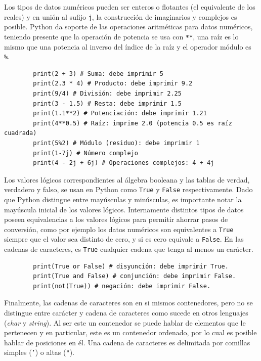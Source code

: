 Los tipos de datos numéricos pueden ser enteros o flotantes (el
equivalente de los reales) y en unión al sufijo \texttt{j}, la
construcción de imaginarios y complejos es posible. Python da soporte de
las operaciones aritméticas para datos numéricos, teniendo presente que
la operación de potencia se usa con \texttt{**}, una raíz es lo mismo
que una potencia al inverso del índice de la raíz y el operador módulo
es \texttt{\%}.

\begin{listing}[H]
    \begin{verbatim}
        print(2 + 3) # Suma: debe imprimir 5
        print(2.3 * 4) # Producto: debe imprimir 9.2
        print(9/4) # División: debe imprimir 2.25
        print(3 - 1.5) # Resta: debe imprimir 1.5
        print(1.1**2) # Potenciación: debe imprimir 1.21
        print(4**0.5) # Raíz: imprime 2.0 (potencia 0.5 es raíz cuadrada)
        print(5%2) # Módulo (residuo): debe imprimir 1
        print(1-7j) # Número complejo
        print(4 - 2j + 6j) # Operaciones complejos: 4 + 4j
    \end{verbatim}
\end{listing}


Los valores lógicos correspondientes al álgebra booleana y las tablas de
verdad, verdadero y falso, se usan en Python como \texttt{True} y
\texttt{False} respectivamente. Dado que Python distingue entre
mayúsculas y minúsculas, es importante notar la mayúscula inicial de los
valores lógicos. Internamente distintos tipos de datos poseen
equivalencias a los valores lógicos para permitir ahorrar pasos de
conversión, como por ejemplo los datos numéricos son equivalentes a
\texttt{True} siempre que el valor sea distinto de cero, y si es cero
equivale a \texttt{False}. En las cadenas de caracteres, es
\texttt{True} cualquier cadena que tenga al menos un carácter.

\begin{listing}[H]
    \begin{verbatim}
        print(True or False) # disyunción: debe imprimir True.
        print(True and False) # conjunción: debe imprimir False.
        print(not(True)) # negación: debe imprimir False.
    \end{verbatim}
\end{listing}


Finalmente, las cadenas de caracteres son en si mismos contenedores,
pero no se distingue entre carácter y cadena de caracteres como sucede
en otros lenguajes (\emph{char} y \emph{string}). Al ser este un
contenedor se puede hablar de elementos que le pertenecen y en
particular, este es un contenedor ordenado, por lo cual es posible
hablar de posiciones en él. Una cadena de caracteres es delimitada por
comillas simples (\texttt{'}) o altas (\texttt{"}).

